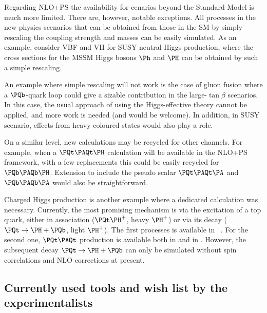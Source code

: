 Regarding NLO+PS the availability for cenarios beyond the
Standard Model is much more limited. There 
are, however, notable exceptions. All processes in the new physics 
scenarios that can be obtained from those in the SM by simply rescaling the 
coupling strength and masses can be easily simulated. As an example, consider
VBF and VH for SUSY neutral Higgs production, where the cross sections for the
MSSM Higgs bosons $\Ph$ and 
$\PH$ can be obtained by such a simple rescaling. 

An example where simple rescaling will not work is the case of gluon fusion 
where a $\PQb$-quark loop could give a sizable contribution in the large-$\tan\beta$ 
scenarios. In this case, the usual approach of using the Higgs-effective
theory cannot be applied, and more work is needed (and would be welcome).  In 
addition, in SUSY scenario, effects from heavy coloured states would also 
play a role.

On a similar level, new calculations may be recycled for other channels. For
example, when a $\PQt\PAQt\PH$ calculation will be available in the 
NLO+PS framework,  with a few replacements this could be easily recycled for 
$\PQb\PAQb\PH$.  Extension to include the pseudo scalar 
$\PQt\PAQt\PA$ and $\PQb\PAQb\PA$ would also be straightforward.

Charged Higgs production is another example where a dedicated calculation was 
necessary.  Currently, the most promising mechanism is via the excitation of 
a top quark, either in association ($\PQt \PH^+$, heavy $\PH^+$) or via 
its decay  
($\PQt \to \PH + \PQb$, light $\PH^+$). The first processes is available 
in \MCatNLO ~\cite{Weydert:2009vr}. For the second one, $\PQt\PAQt$ 
production is available
both in \MCatNLO and in \POWHEG{}. However, the subsequent decay 
$\PQt \to \PH + \PQb$ can only be
simulated without spin correlations and NLO corrections at present.

\subsection{Currently used tools and wish list by the experimentalists}

